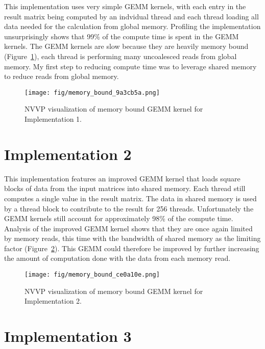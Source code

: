 \documentclass[12pt]{article}
\begin{document}
This implementation uses very simple GEMM kernels, with each entry in the result matrix being computed by an indvidual thread and each thread loading all data needed for the calculation from global memory. Profiling the implementation unsurprisingly shows that 99\% of the compute time is spent in the GEMM kernels. The GEMM kernels are slow because they are heavily memory bound (Figure~\ref{fig:mem_bnd_1}), each thread is performing many uncoalesced reads from global memory. My first step to reducing compute time was to leverage shared memory to reduce reads from global memory.

\begin{figure}[htb]
	\begin{center}
		\texttt{[image: fig/memory\_bound\_9a3cb5a.png]}
		\caption{NVVP visualization of memory bound GEMM kernel for Implementation 1.}
		\label{fig:mem_bnd_1}
	\end{center}
\end{figure}


\section*{Implementation 2}

This implementation features an improved GEMM kernel that loads square blocks of data from the input matrices into shared memory. Each thread still computes a single value in the result matrix. The data in shared memory is used by a thread block to contribute to the result for 256 threads. Unfortunately the GEMM kernels still account for approximately 98\% of the compute time. Analysis of the improved GEMM kernel shows that they are once again limited by memory reads, this time with the bandwidth of shared memory as the limiting factor (Figure~\ref{fig:mem_bnd_2}). This GEMM could therefore be improved by further increasing the amount of computation done with the data from each memory read.

\begin{figure}[htb]
	\begin{center}
		\texttt{[image: fig/memory\_bound\_ce0a10e.png]}
		\caption{NVVP visualization of memory bound GEMM kernel for Implementation 2.}
		\label{fig:mem_bnd_2}
	\end{center}
\end{figure}

\section*{Implementation 3}
\end{document}

